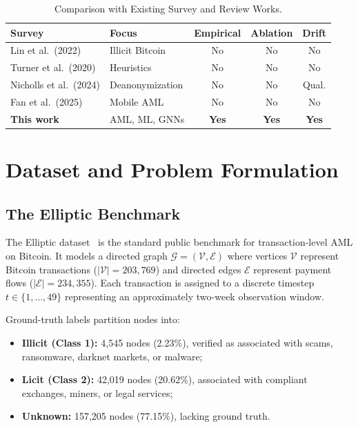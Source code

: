 \documentclass[conference]{IEEEtran}
\begin{document}
\begin{table}[t]
\centering
\caption{Comparison with Existing Survey and Review Works.}
\label{tab:surveys}
\renewcommand{\arraystretch}{1.2}
\scriptsize
\begin{tabular}{@{}p{1.9cm}p{1.4cm}ccc@{}}
\toprule
\textbf{Survey} & \textbf{Focus} & \textbf{Empirical} & \textbf{Ablation} & \textbf{Drift} \\
\midrule
Lin et al.\ (2022)        & Illicit Bitcoin  & No & No & No \\
Turner et al.\ (2020)     & Heuristics       & No & No & No \\
Nicholls et al.\ (2024)   & Deanonymization  & No & No & Qual. \\
Fan et al.\ (2025)        & Mobile AML       & No & No & No \\
\textbf{This work}        & AML, ML, GNNs    & \textbf{Yes} & \textbf{Yes} & \textbf{Yes} \\
\bottomrule
\end{tabular}
\end{table}

\section{Dataset and Problem Formulation}
\label{sec:dataset}

\subsection{The Elliptic Benchmark}

The Elliptic dataset~\cite{weber2019anti} is the standard public benchmark
for transaction-level AML on Bitcoin.
It models a directed graph $\mathcal{G} = (\mathcal{V}, \mathcal{E})$ where
vertices $\mathcal{V}$ represent Bitcoin transactions
($|\mathcal{V}| = 203{,}769$) and directed edges $\mathcal{E}$ represent
payment flows ($|\mathcal{E}| = 234{,}355$).
Each transaction is assigned to a discrete timestep $t \in \{1, \ldots, 49\}$
representing an approximately two-week observation window.

Ground-truth labels partition nodes into:
\begin{itemize}
  \item \textbf{Illicit (Class 1):} 4,545 nodes (2.23\%),
    verified as associated with scams, ransomware, darknet markets, or malware;
  \item \textbf{Licit (Class 2):} 42,019 nodes (20.62\%),
    associated with compliant exchanges, miners, or legal services;
  \item \textbf{Unknown:} 157,205 nodes (77.15\%), lacking ground truth.
\end{itemize}
\end{document}
